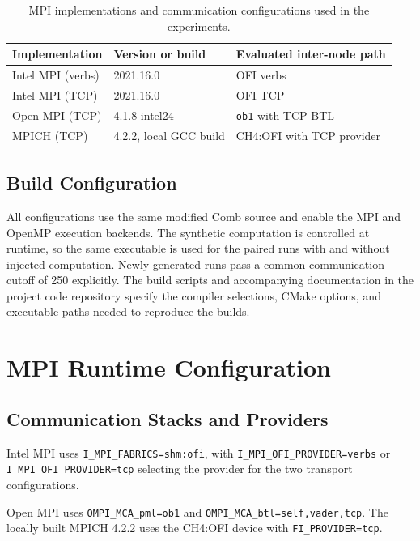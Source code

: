 \begin{table}[htb]
	\centering
	\caption{MPI implementations and communication configurations used in the
		experiments.}
	\label{tab:mpi-implementations}
	\begin{tabular}{lll}
		\toprule
		Implementation & Version or build & Evaluated inter-node path \\
		\midrule
		Intel MPI (verbs) & 2021.16.0 & OFI verbs \\
		Intel MPI (TCP) & 2021.16.0 & OFI TCP \\
		Open MPI (TCP) & 4.1.8-intel24 & \texttt{ob1} with TCP BTL \\
		MPICH (TCP) & 4.2.2, local GCC build & CH4:OFI with TCP provider \\
		\bottomrule
	\end{tabular}
\end{table}

\subsection{Build Configuration}

All configurations use the same modified Comb source and enable the MPI and
OpenMP execution backends. The synthetic computation is controlled at runtime,
so the same executable is used for the paired runs with and without injected
computation. Newly generated runs pass a common communication cutoff of 250
explicitly. The build scripts and accompanying documentation in the project
code repository specify the compiler selections, CMake options, and
executable paths needed to reproduce the builds.

\section{MPI Runtime Configuration}
\label{sec:mpi-runtime-configuration}

\subsection{Communication Stacks and Providers}

Intel MPI uses \texttt{I\_MPI\_FABRICS=shm:ofi}, with
\texttt{I\_MPI\_}\allowbreak\texttt{OFI\_}\allowbreak\texttt{PROVIDER=}\allowbreak\texttt{verbs} or
\texttt{I\_MPI\_}\allowbreak\texttt{OFI\_}\allowbreak\texttt{PROVIDER=}\allowbreak\texttt{tcp} selecting the provider
for the two transport configurations.

Open MPI uses \texttt{OMPI\_MCA\_pml=ob1} and
\texttt{OMPI\_MCA\_btl=self,vader,tcp}.
The locally built MPICH 4.2.2 uses the CH4:OFI device
with \texttt{FI\_PROVIDER=tcp}.

